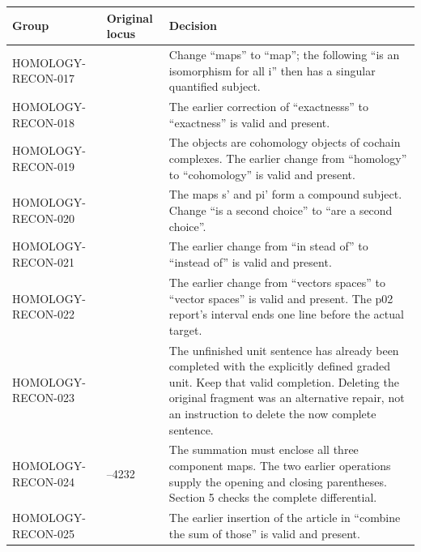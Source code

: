 \documentclass[11pt]{article}
\begin{document}
{\def\LTcaptype{none} %
\begin{longtable}[]{@{}
  >{\raggedright\arraybackslash}p{}
  >{\raggedright\arraybackslash}p{}
  >{\raggedright\arraybackslash}p{}@{}}
\toprule\noalign{}
\begin{minipage}[b]{\linewidth}\raggedright
Group
\end{minipage} & \begin{minipage}[b]{\linewidth}\raggedright
Original locus
\end{minipage} & \begin{minipage}[b]{\linewidth}\raggedright
Decision
\end{minipage} \\
\midrule\noalign{}
\endhead
\bottomrule\noalign{}
\endlastfoot
HOMOLOGY-RECON-017 & 3165 & Change ``maps'' to ``map''; the following ``is an isomorphism for all i'' then has a singular quantified subject. \\
HOMOLOGY-RECON-018 & 3246 & The earlier correction of ``exactnesss'' to ``exactness'' is valid and present. \\
HOMOLOGY-RECON-019 & 3560 & The objects are cohomology objects of cochain complexes. The earlier change from ``homology'' to ``cohomology'' is valid and present. \\
HOMOLOGY-RECON-020 & 3577 & The maps s' and pi' form a compound subject. Change ``is a second choice'' to ``are a second choice''. \\
HOMOLOGY-RECON-021 & 3962 & The earlier change from ``in stead of'' to ``instead of'' is valid and present. \\
HOMOLOGY-RECON-022 & 4048 & The earlier change from ``vectors spaces'' to ``vector spaces'' is valid and present. The p02 report's interval ends one line before the actual target. \\
HOMOLOGY-RECON-023 & 4074 & The unfinished unit sentence has already been completed with the explicitly defined graded unit. Keep that valid completion. Deleting the original fragment was an alternative repair, not an instruction to delete the now complete sentence. \\
HOMOLOGY-RECON-024 & 4231--4232 & The summation must enclose all three component maps. The two earlier operations supply the opening and closing parentheses. Section 5 checks the complete differential. \\
HOMOLOGY-RECON-025 & 4242 & The earlier insertion of the article in ``combine the sum of those'' is valid and present. \\
\end{longtable}
}
\end{document}

